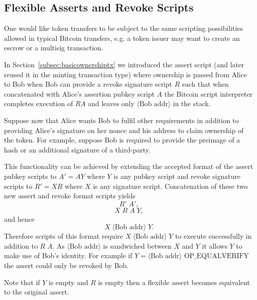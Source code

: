 \documentclass[9pt,oneside]{amsart}
\begin{document}
\begin{multicols}{2}
\subsection{Flexible Asserts and Revoke Scripts}\label{subsec:flexassertrevoke}
One would like token transfers to be subject to the same scripting possibilities allowed in typical Bitcoin transfers, e.g. a token issuer may want to create an escrow or a multisig transaction.

In Section~\ref{subsec:basicownershiptx} we introduced the assert script (and later reused it in the minting transaction type) where ownership is passed from Alice to Bob when Bob can provide a revoke signature script $R$ such that when concatenated with Alice's assertion pubkey script $A$ the Bitcoin script interpreter completes execution of $RA$ and leaves only $\langle \text{Bob addr} \rangle$ in the stack. 

Suppose now that Alice wants Bob to fulfil other requirements in addition to providing Alice's signature on her nonce and his address to claim ownership of the token. For example, suppose Bob is required to provide the preimage of a hash or an additional signature of a third-party. 

This functionality can be achieved by extending the accepted format of the assert pubkey scripts to $A' = A Y$ where $Y$ is any pubkey script and revoke signature scripts to $R' = X R$ where $X$ is any signature script. Concatenation of these two new assert and revoke format scripts yields
\[R' \; A',\]
\[X \; R \; A \; Y,\]
and hence
\[X \; \langle \text{Bob addr} \rangle \; Y.\]
Therefore scripts of this format require $X \; \langle \text{Bob addr} \rangle \; Y$ to execute successfully in addition to $R \; A$. As $\langle \text{Bob addr} \rangle$ is sandwiched between $X$ and $Y$ it allows $Y$ to make use of Bob's identity. For example if $Y=\langle \text{Bob addr} \rangle \text{ OP\_EQUALVERIFY}$ the assert could only be revoked by Bob.

Note that if $Y$ is empty and $R$ is empty then a flexible assert becomes equivalent to the original assert.



\end{multicols}
\end{document}
